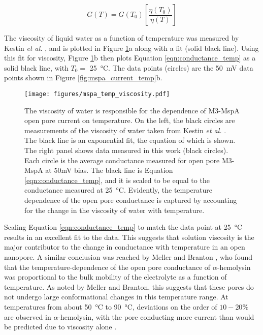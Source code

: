 \begin{equation}
G(T) = G(T_0) \left[ \frac{\eta(T_0)}{\eta(T)} \right]
\label{eqn:conductance_temp}
\end{equation}

The viscosity of liquid water as a function of temperature was measured by Kestin \textit{et al.} \cite{Kestin1978}, and is plotted in Figure \ref{fig:mspa_current_temp_viscosity}a along with a fit (solid black line).  Using this fit for viscosity, Figure \ref{fig:mspa_current_temp_viscosity}b then plots Equation \ref{eqn:conductance_temp} as a solid black line, with $T_0=$ \SI{25}{\degreeCelsius}.  The data points (circles) are the \SI{50}{\mV} data points shown in Figure \ref{fig:mspa_current_temp}b.

\begin{figure}[h]
\begin{centering}
\texttt{[image: figures/mspa\_temp\_viscosity.pdf]}
\caption[MspA current versus temperature explained by viscosity]{The viscosity of water is responsible for the dependence of M3-MspA open pore current on temperature.  On the left, the black circles are measurements of the viscosity of water taken from Kestin \textit{et al.} \cite{Kestin1978}.  The black line is an exponential fit, the equation of which is shown.  The right panel shows data measured in this work (black circles).  Each circle is the average conductance measured for open pore M3-MspA at 50mV bias.  The black line is Equation \ref{eqn:conductance_temp}, and it is scaled to be equal to the conductance measured at \SI{25}{\degreeCelsius}.  Evidently, the temperature dependence of the open pore conductance is captured by accounting for the change in the viscosity of water with temperature.}
\label{fig:mspa_current_temp_viscosity}
\end{centering}
\end{figure}

Scaling Equation \ref{eqn:conductance_temp} to match the data point at \SI{25}{\degreeCelsius} results in an excellent fit to the data.  This suggests that solution viscosity is the major contributor to the  change in conductance with temperature in an open nanopore.  A similar conclusion was reached by Meller and Branton \citep{Meller2002}, who found that the temperature-dependence of the open pore conductance of $\alpha$-hemolysin was proportional to the bulk mobility of the electrolyte as a function of temperature.  As noted by Meller and Branton, this suggests that these pores do not undergo large conformational changes in this temperature range.  At temperatures from about \SI{50}{\degreeCelsius} to \SI{90}{\degreeCelsius}, deviations on the order of $10-20\%$ are observed in $\alpha$-hemolysin, with the pore conducting more current than would be predicted due to viscosity alone \citep{Kang2005}.


